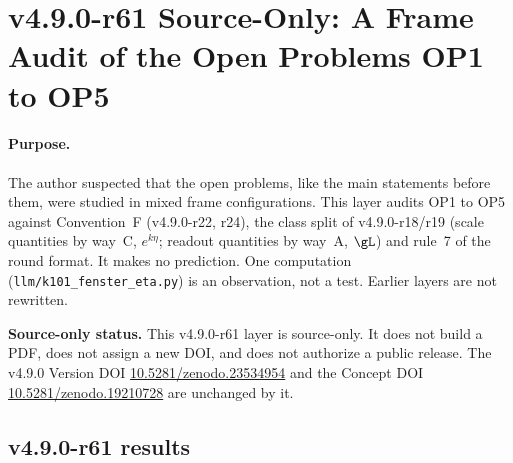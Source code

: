 \clearpage
\section*{v4.9.0-r61 Source-Only: A Frame Audit of the Open Problems OP1 to OP5}
\label{sec:v490-r61-op-frame-audit}

\paragraph{Purpose.}
The author suspected that the open problems, like the main statements before them, were studied in mixed frame configurations.  This layer audits OP1 to OP5 against
Convention~F (v4.9.0-r22, r24), the class split of v4.9.0-r18/r19 (scale quantities by way~C, \(e^{k\eta}\); readout quantities by way~A, \(\gL\)) and rule~7 of the round
format.  It makes no prediction.  One computation (\texttt{llm/k101\_fenster\_eta.py}) is an observation, not a test.  Earlier layers are not rewritten.

\noindent\textbf{Source-only status.}
This v4.9.0-r61 layer is source-only.  It does not build a PDF, does not assign a new DOI,
and does not authorize a public release.  The v4.9.0 Version DOI
\href{https://doi.org/10.5281/zenodo.23534954}{10.5281/zenodo.23534954} and the Concept DOI
\href{https://doi.org/10.5281/zenodo.19210728}{10.5281/zenodo.19210728} are unchanged by it.

\subsection*{v4.9.0-r61 results}
\label{subsec:v490-r61-results}

